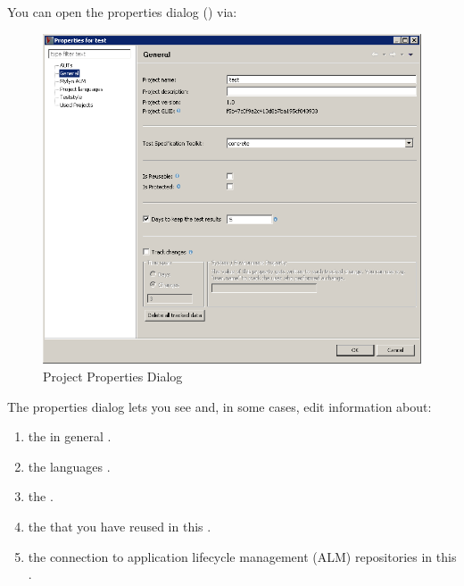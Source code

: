

You can open the \gdproject{} properties dialog () via:\\

\begin{figure}[h]
\begin{center}
\includegraphics[width=12.5cm]{Tasks/Projects/PS/general_projproperties}
\caption{Project Properties Dialog}
\label{projectsettingsdialog}
\end{center}
\end{figure}

The \gdproject{} properties dialog  lets you see and, in some cases, edit information about:
\begin{enumerate}
\item the \gdproject{} in general .
\item the \gdproject{} languages .
\item the \gdauts{} .
\item the \gdprojects{} that you have reused in this \gdproject{} . 
\item the connection to application lifecycle management (ALM) repositories in this \gdproject{} .
\end{enumerate}

